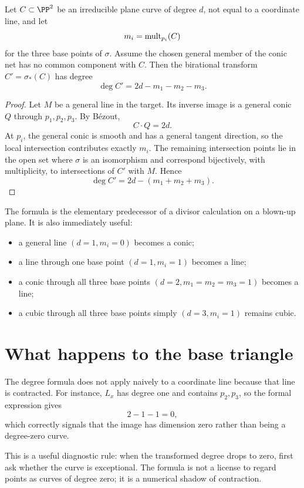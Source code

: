 \begin{theorem}\label{thm:vi44-degree-transform}
Let \(C\subset\PP^2\) be an irreducible plane curve of degree \(d\), not equal to a coordinate line, and let
\[
  m_i=\operatorname{mult}_{p_i}(C)
\]
for the three base points of \(\sigma\).  Assume the chosen general member of the conic net has no common component with \(C\).  Then the birational transform \(C'=\sigma_*(C)\) has degree
\[
  \boxed{\deg C'=2d-m_1-m_2-m_3.}
\]
\end{theorem}

\begin{proof}
Let \(M\) be a general line in the target.  Its inverse image is a general conic \(Q\) through \(p_1,p_2,p_3\).  By B\'ezout,
\[
  C\cdot Q=2d.
\]
At \(p_i\), the general conic is smooth and has a general tangent direction, so the local intersection contributes exactly \(m_i\).  The remaining intersection points lie in the open set where \(\sigma\) is an isomorphism and correspond bijectively, with multiplicity, to intersections of \(C'\) with \(M\).  Hence
\[
  \deg C'=2d-(m_1+m_2+m_3).
\]
\end{proof}

The formula is the elementary predecessor of a divisor calculation on a blown-up plane.  It is also immediately useful:
\begin{itemize}
\item a general line \((d=1,m_i=0)\) becomes a conic;
\item a line through one base point \((d=1,m_i=1)\) becomes a line;
\item a conic through all three base points \((d=2,m_1=m_2=m_3=1)\) becomes a line;
\item a cubic through all three base points simply \((d=3,m_i=1)\) remains cubic.
\end{itemize}

\section{What happens to the base triangle}

The degree formula does not apply naively to a coordinate line because that line is contracted.  For instance, \(L_x\) has degree one and contains \(p_2,p_3\), so the formal expression gives
\[
  2-1-1=0,
\]
which correctly signals that the image has dimension zero rather than being a degree-zero curve.

This is a useful diagnostic rule: when the transformed degree drops to zero, first ask whether the curve is exceptional.  The formula is not a license to regard points as curves of degree zero; it is a numerical shadow of contraction.

